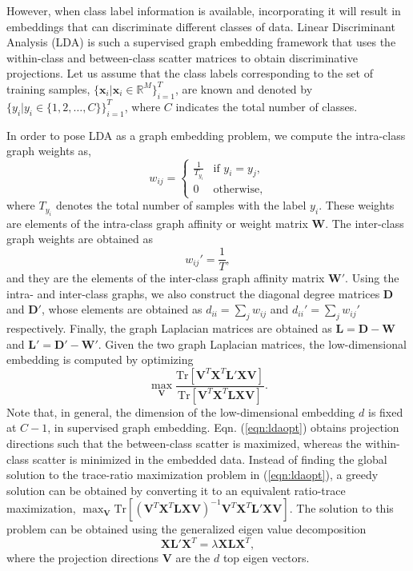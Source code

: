 However, when class label information is available, incorporating it will result in embeddings that can discriminate different classes of data. Linear Discriminant Analysis (LDA) is such a supervised graph embedding framework that uses the within-class and between-class scatter matrices to obtain discriminative projections. Let us assume that the class labels corresponding to the set of training samples, $\{\mathbf{x}_i|\mathbf{x}_i \in \mathbb{R}^M\}_{i=1}^T$, are known and denoted by $\{y_i|y_i \in \{1,2,\ldots,C\}\}_{i=1}^T$, where $C$ indicates the total number of classes. 

In order to pose LDA as a graph embedding problem, we compute the intra-class graph weights as,
\begin{equation}
w_{ij} = 
\begin{cases}
\frac{1}{T_{y_i}} & \text{if } y_i = y_j, \\
0 & \text{otherwise},
\end{cases}
\label{eqn:ldaintra}
\end{equation}where $T_{y_i}$ denotes the total number of samples with the label $y_i$. These weights are elements of the intra-class graph affinity or weight matrix $\mathbf{W}$. The inter-class graph weights are obtained as
\begin{equation}
w_{ij}' = \frac{1}{T},
\label{eqn:ldainter}
\end{equation} and they are the elements of the inter-class graph affinity matrix $\mathbf{W}'$. Using the intra- and inter-class graphs, we also construct the diagonal degree matrices $\mathbf{D}$ and $\mathbf{D}'$, whose elements are obtained as $d_{ii} = \sum_j w_{ij}$ and $d_{ii}' = \sum_j w_{ij}'$ respectively. Finally, the graph Laplacian matrices are obtained as $\mathbf{L} = \mathbf{D} - \mathbf{W}$ and $\mathbf{L}' = \mathbf{D}' - \mathbf{W}'$. Given the two graph Laplacian matrices, the low-dimensional embedding is computed by optimizing
\begin{equation}
\max_{\mathbf{V}} \frac{\text{Tr}[\mathbf{V}^T \mathbf{X}^T \mathbf{L}' \mathbf{X} \mathbf{V}]}{\text{Tr}[\mathbf{V}^T \mathbf{X}^T \mathbf{L} \mathbf{X} \mathbf{V}]}.
\label{eqn:ldaopt}
\end{equation}Note that, in general, the dimension of the low-dimensional embedding $d$ is fixed at $C-1$, in supervised graph embedding. Eqn. (\ref{eqn:ldaopt}) obtains projection directions such that the between-class scatter is maximized, whereas the within-class scatter is minimized in the embedded data. Instead of finding the global solution to the trace-ratio maximization problem in (\ref{eqn:ldaopt}), a greedy solution can be obtained by converting it to an equivalent ratio-trace maximization, $\max_{\mathbf{V}} \text{Tr}[(\mathbf{V}^T \mathbf{X}^T \mathbf{L} \mathbf{X} \mathbf{V})^{-1}\mathbf{V}^T \mathbf{X}^T \mathbf{L}' \mathbf{X} \mathbf{V}]$. The solution to this problem can be obtained using the generalized eigen value decomposition
\begin{equation}
\mathbf{X} \mathbf{L}' \mathbf{X}^T = \lambda \mathbf{X} \mathbf{L} \mathbf{X}^T,
\label{eqn:geneig}
\end{equation}where the projection directions $\mathbf{V}$ are the $d$ top eigen vectors.


